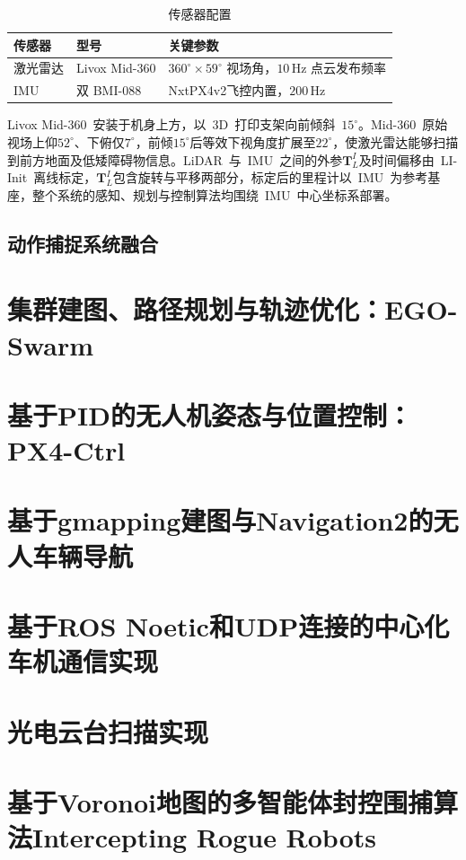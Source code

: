 \begin{table}[H]
\centering
\caption{传感器配置}
\label{tab:sensors}
\begin{tabular}{lll}
\toprule
\textbf{传感器} & \textbf{型号} & \textbf{关键参数} \\
\midrule
激光雷达   & Livox Mid-360 & $360^\circ\times59^\circ$ 视场角，$10\,\text{Hz}$ 点云发布频率 \\
IMU        & 双 BMI-088  & NxtPX4v2飞控内置，$200\,\text{Hz}$ \\
\bottomrule
\end{tabular}
\end{table}

Livox Mid-360~安装于机身上方，以~3D~打印支架向前倾斜~$15^\circ$。Mid-360~原始视场上仰$52^\circ$、下俯仅$7^\circ$，前倾$15^\circ$后等效下视角度扩展至$22^\circ$，使激光雷达能够扫描到前方地面及低矮障碍物信息。LiDAR~与~IMU~之间的外参$\mathbf{T}_L^I$及时间偏移由~LI-Init~离线标定，$\mathbf{T}_L^I$包含旋转与平移两部分，标定后的里程计以~IMU~为参考基座，整个系统的感知、规划与控制算法均围绕~IMU~中心坐标系部署。


\subsection{动作捕捉系统融合}
\section{集群建图、路径规划与轨迹优化：EGO-Swarm}

\section{基于PID的无人机姿态与位置控制：PX4-Ctrl}

\section{基于gmapping建图与Navigation2的无人车辆导航}

\section{基于ROS Noetic和UDP连接的中心化车机通信实现}

\section{光电云台扫描实现}

\section{基于Voronoi地图的多智能体封控围捕算法Intercepting Rogue Robots}


